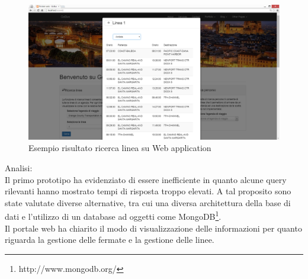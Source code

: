 \begin{figure}[tb]
\centering
\includegraphics[scale=.3]{img/20.png}
\caption{Esempio risultato ricerca linea su Web application }
\label{fig:mhs}
\end{figure} 


Analisi:\\
Il primo prototipo ha evidenziato di essere inefficiente in quanto alcune query rilevanti hanno mostrato tempi di risposta troppo elevati. A tal proposito sono state valutate diverse alternative, tra cui una diversa architettura della base di dati e l\rq utilizzo di un database ad oggetti come MongoDB\footnote{http://www.mongodb.org/ }.\\
Il portale web ha chiarito il modo di visualizzazione delle informazioni per quanto riguarda la gestione delle fermate e la gestione delle linee. 



